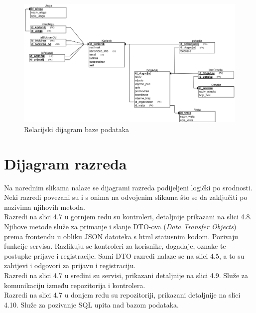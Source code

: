 			\begin{figure}[H]
				\includegraphics[width=\textwidth]{dijagrami/Baza podataka/REL shema.png}
				\caption{Relacijski dijagram baze podataka}
			\end{figure}
				
			\vfill
			\clearpage
			
			\eject
			
			
		\section{Dijagram razreda}
			
			\indent Na narednim slikama nalaze se dijagrami razreda podijeljeni logički po srodnosti. Neki razredi povezani su i s onima na odvojenim slikama što se da zaključiti po nazivima njihovih metoda. \\
			
			\indent Razredi na slici 4.7 u gornjem redu su kontroleri, detaljnije prikazani na slici 4.8. Njihove metode služe za primanje i slanje DTO-ova (\textit{Data Transfer Objects}) prema frontendu u obliku JSON datoteka s html statusnim kodom. Pozivaju funkcije servisa. Razlikuju se kontroleri za korisnike, događaje, oznake te postupke prijave i registracije. Sami DTO razredi nalaze se na slici 4.5, a to su zahtjevi i odgovori za prijavu i registraciju. \\
			
			\indent Razredi na slici 4.7 u sredini su servisi, prikazani detaljnije na slici 4.9. Služe za komunikaciju između repozitorija i kontrolera. \\
			
			\indent Razredi na slici 4.7 u donjem redu su repozitoriji, prikazani detaljnije na slici 4.10. Služe za pozivanje SQL upita nad bazom podataka. \\
			
